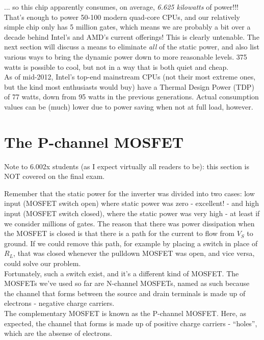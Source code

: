 \documentclass[12pt,a4paper]{report}
\begin{document}
... so this chip apparently consumes, on average, \emph{6.625 kilowatts} of power!!! That's enough to power 50-100 modern quad-core CPUs, and our relatively simple chip only has 5 million gates, which means we are probably a bit over a decade behind Intel's and AMD's current offerings! This is clearly untenable. The next section will discuss a means to eliminate \emph{all} of the static power, and also list various ways to bring the dynamic power down to more reasonable levels. 375 watts is possible to cool, but not in a way that is both quiet and cheap.\\
As of mid-2012, Intel's  top-end mainstream CPUs (not their most extreme ones, but the kind most enthusiasts would buy) have a Thermal Design Power (TDP) of 77 watts, down from 95 watts in the previous generations. Actual consumption values can be (much) lower due to power saving when not at full load, however.



\section{The P-channel MOSFET}

\large{Note to 6.002x students (as I expect virtually all readers to be): this section is NOT covered on the final exam.}\\
\normalsize

Remember that the static power for the inverter was divided into two cases: low input (MOSFET switch open) where static power was zero - excellent! - and high input (MOSFET switch closed), where the static power was very high - at least if we consider millions of gates. The reason that there was power dissipation when the MOSFET is closed is that there is a path for the current to flow from $V_S$ to ground. If we could remove this path, for example by placing a switch in place of $R_L$, that was closed whenever the pulldown MOSFET was open, and vice versa, could solve our problem.\\

Fortunately, such a switch exist, and it's a different kind of MOSFET. The MOSFETs we've used so far are N-channel MOSFETs, named as such because the channel that forms between the source and drain terminals is made up of electrons - negative charge carriers.\\
The complementary MOSFET is known as the P-channel MOSFET. Here, as expected, the channel that forms is made up of positive charge carriers - ``holes'', which are the absense of electrons.\\
\end{document}
